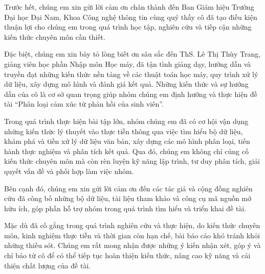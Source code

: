 Trước hết, chúng em xin gửi lời cảm ơn chân thành đến Ban Giám hiệu Trường Đại học Đại Nam, Khoa Công nghệ thông tin cùng quý thầy cô đã tạo điều kiện thuận lợi cho chúng em trong quá trình học tập, nghiên cứu và tiếp cận những kiến thức chuyên môn cần thiết.

Đặc biệt, chúng em xin bày tỏ lòng biết ơn sâu sắc đến ThS. Lê Thị Thùy Trang, giảng viên học phần Nhập môn Học máy, đã tận tình giảng dạy, hướng dẫn và truyền đạt những kiến thức nền tảng về các thuật toán học máy, quy trình xử lý dữ liệu, xây dựng mô hình và đánh giá kết quả. Những kiến thức và sự hướng dẫn của cô là cơ sở quan trọng giúp nhóm chúng em định hướng và thực hiện đề tài “Phân loại cảm xúc từ phản hồi của sinh viên”.

Trong quá trình thực hiện bài tập lớn, nhóm chúng em đã có cơ hội vận dụng những kiến thức lý thuyết vào thực tiễn thông qua việc tìm hiểu bộ dữ liệu, khám phá và tiền xử lý dữ liệu văn bản, xây dựng các mô hình phân loại, tiến hành thực nghiệm và phân tích kết quả. Qua đó, chúng em không chỉ củng cố kiến thức chuyên môn mà còn rèn luyện kỹ năng lập trình, tư duy phân tích, giải quyết vấn đề và phối hợp làm việc nhóm.

Bên cạnh đó, chúng em xin gửi lời cảm ơn đến các tác giả và cộng đồng nghiên cứu đã công bố những bộ dữ liệu, tài liệu tham khảo và công cụ mã nguồn mở hữu ích, góp phần hỗ trợ nhóm trong quá trình tìm hiểu và triển khai đề tài.

Mặc dù đã cố gắng trong quá trình nghiên cứu và thực hiện, do kiến thức chuyên môn, kinh nghiệm thực tiễn và thời gian còn hạn chế, bài báo cáo khó tránh khỏi những thiếu sót. Chúng em rất mong nhận được những ý kiến nhận xét, góp ý và chỉ bảo từ cô để có thể tiếp tục hoàn thiện kiến thức, nâng cao kỹ năng và cải thiện chất lượng của đề tài.
